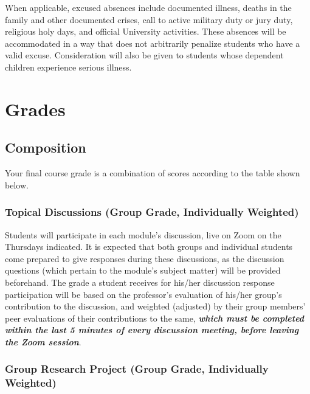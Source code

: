 \documentclass[10pt,]{article}
\begin{document}
When applicable, excused absences include documented illness, deaths in
the family and other documented crises, call to active military duty or
jury duty, religious holy days, and official University activities.
These absences will be accommodated in a way that does not arbitrarily
penalize students who have a valid excuse. Consideration will also be
given to students whose dependent children experience serious illness.

\hypertarget{grades}{%
\section{Grades}\label{grades}}

\hypertarget{composition}{%
\subsection{Composition}\label{composition}}

Your final course grade is a combination of scores according to the
table shown below.

\hypertarget{topical-discussions-group-grade-individually-weighted}{%
\subsubsection{Topical Discussions (Group Grade, Individually
Weighted)}\label{topical-discussions-group-grade-individually-weighted}}

Students will participate in each module's discussion, live on Zoom on
the Thursdays indicated. It is expected that both groups and individual
students come prepared to give responses during these discussions, as
the discussion questions (which pertain to the module's subject matter)
will be provided beforehand. The grade a student receives for his/her
discussion response participation will be based on the professor's
evaluation of his/her group's contribution to the discussion, and
weighted (adjusted) by their group members' peer evaluations of their
contributions to the same, \textbf{\emph{which must be completed within
the last 5 minutes of every discussion meeting, before leaving the Zoom
session}}.

\hypertarget{group-research-project-group-grade-individually-weighted}{%
\subsubsection{Group Research Project (Group Grade, Individually
Weighted)}\label{group-research-project-group-grade-individually-weighted}}
\end{document}
